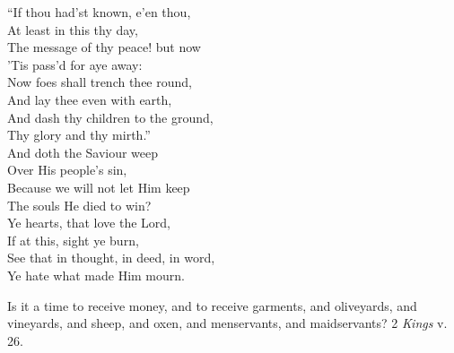   “If thou had’st known, e’en thou, \\
 At least in this thy day, \\
 The message of thy peace! but now \\
 ’Tis pass’d for aye away: \\
 Now foes shall trench thee round, \\
 And lay thee even with earth, \\
 And dash thy children to the ground, \\
 Thy glory and thy mirth.” \\
  And doth the Saviour weep \\
 Over His people’s sin, \\
 Because we will not let Him keep \\
 The souls He died to win? \\
 Ye hearts, that love the Lord, \\
 If at this, sight ye burn, \\
 See that in thought, in deed, in word, \\
 Ye hate what made Him mourn.\\


Is it a time to receive money, and to receive garments, and oliveyards, and vineyards, and sheep, and oxen, and menservants, and maidservants? 2 \emph{Kings} v. 26.


